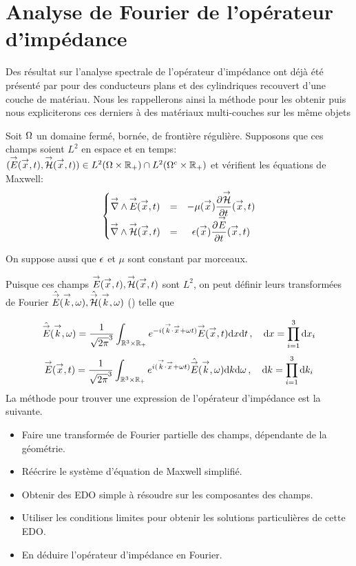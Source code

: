 \section{Analyse de Fourier de l'opérateur d'impédance}

Des résultat sur l'analyse spectrale de l'opérateur d'impédance ont déjà été présenté par \cite{hoppe_impedance_1995} pour des conducteurs plans et des cylindriques recouvert d'une couche de matériau.
Nous les rappellerons ainsi la méthode pour les obtenir puis nous expliciterons ces derniers à des matériaux multi-couches sur les même objets


Soit \(\Omega\) un domaine fermé, bornée, de frontière régulière. Supposons que ces champs soient \(L^2\) en espace et en temps: \(({\overset{\rightarrow}{E}}({\overset{\rightarrow}{x}},t),{\overset{\rightarrow}{\mathcal{H}}}({\overset{\rightarrow}{x}},t)) \in L^2(\Omega \times \mathbb R_+) \cap L^2(\Omega^c\times\mathbb R_+)\) et vérifient les équations de Maxwell:
\begin{equation}
    \left\lbrace
    \begin{matrix}
    {\overset{\rightarrow}{\nabla}}\wedge {\overset{\rightarrow}{E}}({\overset{\rightarrow}{x}},t) &=& -\mu({\overset{\rightarrow}{x}}) \dfrac{\partial^{{}} {\overset{\rightarrow}{\mathcal{H}}}}{{\partial t}^{{}}}({\overset{\rightarrow}{x}},t) \\
    {\overset{\rightarrow}{\nabla}}\wedge {\overset{\rightarrow}{\mathcal{H}}}({\overset{\rightarrow}{x}},t) &=& \epsilon({\overset{\rightarrow}{x}}) \dfrac{\partial^{{}} {\overset{\rightarrow}{E}}}{{\partial t}^{{}}}({\overset{\rightarrow}{x}},t)
    \end{matrix}
    \right.
\end{equation}

On suppose aussi que \(\epsilon\) et \(\mu\) sont constant par morceaux.

Puisque ces champs \({\overset{\rightarrow}{E}}({\overset{\rightarrow}{x}},t),{\overset{\rightarrow}{\mathcal{H}}}({\overset{\rightarrow}{x}},t)\) sont \(L^2\), on peut définir leurs transformées de Fourier \(\hat{{\overset{\rightarrow}{E}}}({\overset{\rightarrow}{k}},\omega), \hat{{\overset{\rightarrow}{\mathcal{H}}}}({\overset{\rightarrow}{k}},\omega)\) (\cite[Théorème de Plancherel, p.~153]{yosida_functional_1995}) telle que

\begin{equation}
    \hat{{\overset{\rightarrow}{E}}} ({\overset{\rightarrow}{k}},\omega) = \dfrac{1}{\sqrt{2\pi}^3}\int_{\mathbb R^3\times\mathbb R_+} e^{-i({\overset{\rightarrow}{k}} \cdot {\overset{\rightarrow}{x}}+\omega t)}{\overset{\rightarrow}{E}}({\overset{\rightarrow}{x}},t) \mathrm{d}{x}\mathrm{d}{t}\,, \quad \mathrm{d} x = \prod\limits_{i=1}^3 \mathrm{d}{x}_i
\end{equation}
\begin{equation}
    {\overset{\rightarrow}{E}}({\overset{\rightarrow}{x}},t) = \dfrac{1}{\sqrt{2\pi}^3}\int_{\mathbb R^3\times\mathbb R_+} e^{i({\overset{\rightarrow}{k}} \cdot {\overset{\rightarrow}{x}}+\omega t)}\hat{{\overset{\rightarrow}{E}}} ({\overset{\rightarrow}{k}},\omega) \mathrm{d}{k} \mathrm{d}{\omega}\,, \quad \mathrm{d} k = \prod\limits_{i=1}^3 \mathrm{d}{k}_i
\end{equation}
La méthode pour trouver une expression de l'opérateur d'impédance est la suivante.
\begin{itemize}
\item Faire une transformée de Fourier partielle des champs, dépendante de la géométrie.
\item Réécrire le système d'équation de Maxwell simplifié.
\item Obtenir des EDO simple à résoudre sur les composantes des champs.
\item Utiliser les conditions limites pour obtenir les solutions particulières de cette EDO.
\item En déduire l'opérateur d'impédance en Fourier.
\end{itemize}

